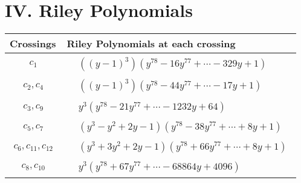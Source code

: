 \documentclass[1p]{elsarticle_modified}
\theoremstyle{definition}
\begin{document}
\centering \section*{ IV. Riley Polynomials}
\begin{tabular}{m{50pt}|m{274pt}}
Crossings & \hspace{64pt}Riley Polynomials at each crossing \\
\hline $$\begin{aligned}c_{1}\end{aligned}$$&$\begin{aligned}
&((y-1)^3)(y^{78}-16 y^{77}+\cdots-329 y+1)
\end{aligned}$\\
\hline $$\begin{aligned}c_{2},c_{4}\end{aligned}$$&$\begin{aligned}
&((y-1)^3)(y^{78}-44 y^{77}+\cdots-17 y+1)
\end{aligned}$\\
\hline $$\begin{aligned}c_{3},c_{9}\end{aligned}$$&$\begin{aligned}
&y^3(y^{78}-21 y^{77}+\cdots-1232 y+64)
\end{aligned}$\\
\hline $$\begin{aligned}c_{5},c_{7}\end{aligned}$$&$\begin{aligned}
&(y^3- y^2+2 y-1)(y^{78}-38 y^{77}+\cdots+8 y+1)
\end{aligned}$\\
\hline $$\begin{aligned}c_{6},c_{11},c_{12}\end{aligned}$$&$\begin{aligned}
&(y^3+3 y^2+2 y-1)(y^{78}+66 y^{77}+\cdots+8 y+1)
\end{aligned}$\\
\hline $$\begin{aligned}c_{8},c_{10}\end{aligned}$$&$\begin{aligned}
&y^3(y^{78}+67 y^{77}+\cdots-68864 y+4096)
\end{aligned}$\\
\hline
\end{tabular}
\vskip 2pc
\end{document}
